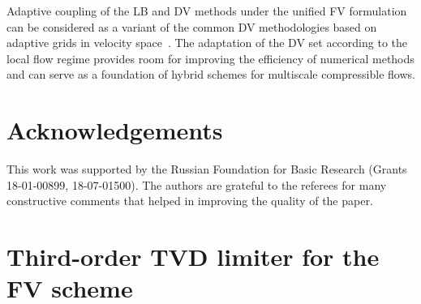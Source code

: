 \documentclass{elsarticle} %
\newcommand{\Ma}{\mathrm{Ma}}
\begin{document}
Adaptive coupling of the LB and DV methods under the unified FV formulation can be considered
as a variant of the common DV methodologies based on adaptive grids in velocity space~\cite{Aristov1977, Kolobov2013, Baranger2014}.
The adaptation of the DV set according to the local flow regime provides room for improving the efficiency of numerical methods
and can serve as a foundation of hybrid schemes for multiscale compressible flows.



\section*{Acknowledgements}

This work was supported by the Russian Foundation for Basic Research (Grants 18-01-00899, 18-07-01500).
The authors are grateful to the referees for many constructive comments that helped in improving the quality of the paper.

\appendix

\section{Third-order TVD limiter for the FV scheme}\label{sec:limiter}
\end{document}
